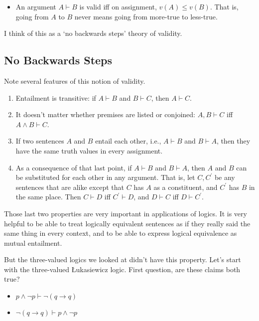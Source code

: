 \documentclass[
]{article}
\providecommand{\tightlist}{%
  \setlength{\itemsep}{0pt}\setlength{\parskip}{0pt}}\usepackage{longtable,booktabs,array}
\begin{document}
\begin{itemize}
\tightlist
\item
  An argument \(A \vdash B\) is valid iff on assignment,
  \(v(A) \leq v(B)\). That is, going from \(A\) to \(B\) never means
  going from more-true to less-true.
\end{itemize}

I think of this as a `no backwards steps' theory of validity.

\hypertarget{no-backwards-steps}{%
\subsection{No Backwards Steps}\label{no-backwards-steps}}

Note several features of this notion of validity.

\begin{enumerate}
\def\labelenumi{\arabic{enumi}.}
\tightlist
\item
  Entailment is transitive: if \(A \vdash B\) and \(B \vdash C\), then
  \(A \vdash C\).
\item
  It doesn't matter whether premises are listed or conjoined:
  \(A, B \vdash C\) iff \(A \wedge B \vdash C\).
\item
  If two sentences \(A\) and \(B\) entail each other, i.e.,
  \(A \vdash B\) and \(B \vdash A\), then they have the same truth
  values in every assignment.
\item
  As a consequence of that last point, if \(A \vdash B\) and
  \(B \vdash A\), then \(A\) and \(B\) can be substituted for each other
  in any argument. That is, let \(C, C^\prime\) be any sentences that
  are alike except that \(C\) has \(A\) as a constituent, and
  \(C^\prime\) has \(B\) in the same place. Then \(C \vdash D\) iff
  \(C^\prime \vdash D\), and \(D \vdash C\) iff \(D \vdash C^\prime\).
\end{enumerate}

Those last two properties are very important in applications of logics.
It is very helpful to be able to treat logically equivalent sentences as
if they really said the same thing in every context, and to be able to
express logical equivalence as mutual entailment.

But the three-valued logics we looked at didn't have this property.
Let's start with the three-valued Łukasiewicz logic. First question, are
these claims both true?

\begin{itemize}
\tightlist
\item
  \(p \wedge \neg p \vdash \neg (q \rightarrow q)\)
\item
  \(\neg (q \rightarrow q) \vdash p \wedge \neg p\)
\end{itemize}
\end{document}
